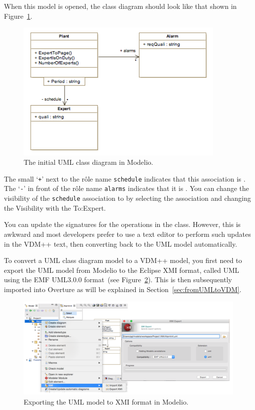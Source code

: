 %
When this model is opened, the class diagram should look like that shown in Figure~\ref{fig:initialumlmodelio}.
%
\begin{figure}[htbp]
\begin{center}
\includegraphics[width=4in]{figures/initialumlmodelio}
\caption{The initial UML class diagram in Modelio.\label{fig:initialumlmodelio}}
\end{center}
\end{figure}
%
The small `\texttt{+}' next to the r\^{o}le name \texttt{schedule} indicates that this association is . The `\texttt{-}' in front of the r\^{o}le name \texttt{alarms} indicates that it is . You can change the visibility of the \texttt{schedule} association to  by selecting the association and changing the \textsf{Visibility} with the \textsf{To:Expert}.

You can update the signatures for the operations in the  class. However, this is awkward and most developers prefer to use a text editor to perform such updates in the VDM++ text, then converting back to the UML model automatically.

To convert a UML class diagram model to a VDM++ model, you first need to export the UML model from Modelio to the Eclipse XMI format, called UML using the EMF UML3.0.0 format~(see Figure~\ref{fig:xmiexportmodelio}). This is then subsequently imported into Overture as will be explained in Section~\ref{sec:fromUMLtoVDM}.
%
\begin{figure}[htbp]
\begin{center}
\includegraphics[width=4.5in]{figures/xmiexportmodelio}
\caption{Exporting the UML model to XMI format in Modelio.\label{fig:xmiexportmodelio}}
\end{center}
\end{figure}
%

